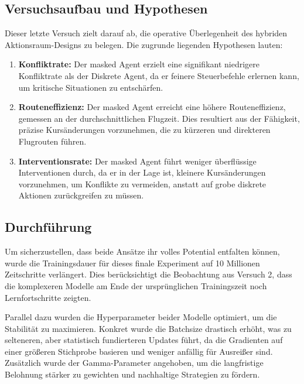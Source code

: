 \subsection{Versuchsaufbau und Hypothesen}
Dieser letzte Versuch zielt darauf ab, die operative Überlegenheit des hybriden Aktionsraum-Designs zu belegen. Die zugrunde liegenden Hypothesen lauten:
\begin{enumerate}
    \item \textbf{Konfliktrate:} Der masked Agent erzielt eine signifikant niedrigere Konfliktrate als der Diskrete Agent, da er feinere Steuerbefehle erlernen kann, um kritische Situationen zu entschärfen.
    \item \textbf{Routeneffizienz:} Der masked Agent erreicht eine höhere Routeneffizienz, gemessen an der durchschnittlichen Flugzeit. Dies resultiert aus der Fähigkeit, präzise Kursänderungen vorzunehmen, die zu kürzeren und direkteren Flugrouten führen.
    \item \textbf{Interventionsrate:} Der masked Agent führt weniger überflüssige Interventionen durch, da er in der Lage ist, kleinere Kursänderungen vorzunehmen, um Konflikte zu vermeiden, anstatt auf grobe diskrete Aktionen zurückgreifen zu müssen.
\end{enumerate}

\subsection{Durchführung}
Um sicherzustellen, dass beide Ansätze ihr volles Potential entfalten können, wurde die Trainingsdauer für dieses finale Experiment auf 10 Millionen Zeitschritte verlängert. Dies berücksichtigt die Beobachtung aus Versuch 2, dass die komplexeren Modelle am Ende der ursprünglichen Trainingszeit noch Lernfortschritte zeigten.
\medskip

Parallel dazu wurden die Hyperparameter beider Modelle optimiert, um die Stabilität zu maximieren. Konkret wurde die Batchsize drastisch erhöht, was zu selteneren, aber statistisch fundierteren Updates führt, da die Gradienten auf einer größeren Stichprobe basieren und weniger anfällig für Ausreißer sind. Zusätzlich wurde der Gamma-Parameter angehoben, um die langfristige Belohnung stärker zu gewichten und nachhaltige Strategien zu fördern.
\medskip

